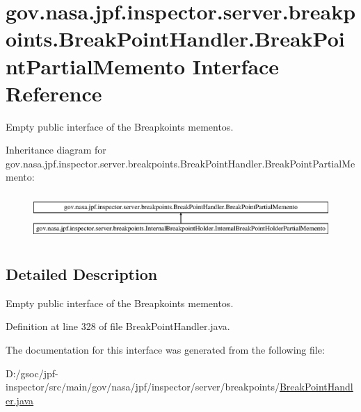 \hypertarget{interfacegov_1_1nasa_1_1jpf_1_1inspector_1_1server_1_1breakpoints_1_1_break_point_handler_1_1_break_point_partial_memento}{}\section{gov.\+nasa.\+jpf.\+inspector.\+server.\+breakpoints.\+Break\+Point\+Handler.\+Break\+Point\+Partial\+Memento Interface Reference}
\label{interfacegov_1_1nasa_1_1jpf_1_1inspector_1_1server_1_1breakpoints_1_1_break_point_handler_1_1_break_point_partial_memento}


Empty public interface of the Breapkoints mementos.  


Inheritance diagram for gov.\+nasa.\+jpf.\+inspector.\+server.\+breakpoints.\+Break\+Point\+Handler.\+Break\+Point\+Partial\+Memento\+:\begin{figure}[H]
\begin{center}
\leavevmode
\includegraphics[height=1.772152cm]{interfacegov_1_1nasa_1_1jpf_1_1inspector_1_1server_1_1breakpoints_1_1_break_point_handler_1_1_break_point_partial_memento}
\end{center}
\end{figure}


\subsection{Detailed Description}
Empty public interface of the Breapkoints mementos. 

Definition at line 328 of file Break\+Point\+Handler.\+java.



The documentation for this interface was generated from the following file\+:\begin{DoxyCompactItemize}
\item 
D\+:/gsoc/jpf-\/inspector/src/main/gov/nasa/jpf/inspector/server/breakpoints/\hyperlink{_break_point_handler_8java}{Break\+Point\+Handler.\+java}\end{DoxyCompactItemize}
